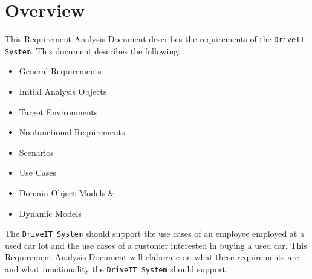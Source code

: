 \section{Overview}
This Requirement Analysis Document describes the requirements of the \texttt{DriveIT System}.
This document describes the following:
\begin{itemize}
	\item General Requirements
	\item Initial Analysis Objects
	\item Target Environments
	\item Nonfunctional Requirements
	\item Scenarios
	\item Use Cases 
	\item Domain Object Models \& 
	\item Dynamic Models 
\end{itemize}
The \texttt{DriveIT System} should support the use cases of an employee employed at a used car lot and the use cases of a customer interested in buying a used car.
This Requirement Analysis Document will elaborate on what these requirements are and what functionality the \texttt{DriveIT System} should support.
